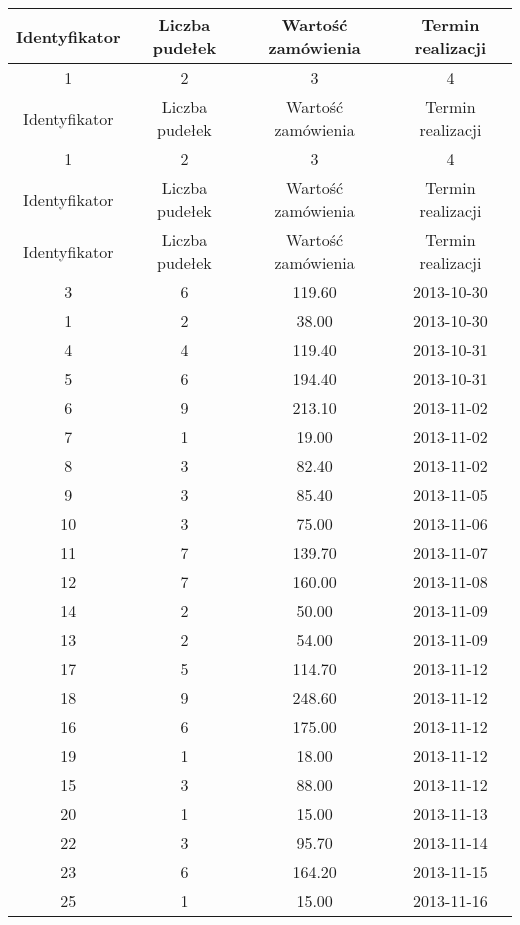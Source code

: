 \documentclass[a4paper,11pt]{article}
\begin{document}
\begin{longtable}{|c|c|c|c|}
\hline  Identyfikator&Liczba pudełek&Wartość zamówienia&Termin realizacji \\ \hline
 1&2&3&4\\ \hline
 \endfirsthead
  \hline Identyfikator&Liczba pudełek&Wartość zamówienia&Termin realizacji \\ \hline 
  1&2&3&4\\ \hline
  \endhead
  

  Identyfikator&Liczba pudełek&Wartość zamówienia&Termin realizacji \\ \hline 
  \endfoot

  Identyfikator&Liczba pudełek&Wartość zamówienia&Termin realizacji \\ \hline 
  \endlastfoot

	 3 &   6 & 119.60 & 2013-10-30\\ \hline
	 1 &   2 &  38.00 & 2013-10-30\\ \hline
	 4 &   4 & 119.40 & 2013-10-31\\ \hline
	 5 &   6 & 194.40 & 2013-10-31\\ \hline
	 6 &   9 & 213.10 & 2013-11-02\\ \hline
	 7 &   1 &  19.00 & 2013-11-02\\ \hline
	 8 &   3 &  82.40 & 2013-11-02\\ \hline
	 9 &   3 &  85.40 & 2013-11-05\\ \hline
	 10 &   3 &  75.00 & 2013-11-06\\ \hline
	 11 &   7 & 139.70 & 2013-11-07\\ \hline
	 12 &   7 & 160.00 & 2013-11-08\\ \hline
	 14 &   2 &  50.00 & 2013-11-09\\ \hline
	 13 &   2 &  54.00 & 2013-11-09\\ \hline
	 17 &   5 & 114.70 & 2013-11-12\\ \hline
	 18 &   9 & 248.60 & 2013-11-12\\ \hline
	 16 &   6 & 175.00 & 2013-11-12\\ \hline
	 19 &   1 &  18.00 & 2013-11-12\\ \hline
	 15 &   3 &  88.00 & 2013-11-12\\ \hline
	 20 &   1 &  15.00 & 2013-11-13\\ \hline
	 22 &   3 &  95.70 & 2013-11-14\\ \hline
	 23 &   6 & 164.20 & 2013-11-15\\ \hline
	 25 &   1 &  15.00 & 2013-11-16\\ \hline

\end{longtable}
\end{document}
